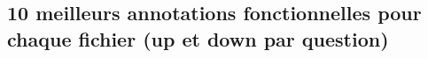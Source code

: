 \documentclass[a4paper]{article}
\begin{document}
\par



%

\par
\subsection*{10 meilleurs annotations fonctionnelles pour chaque fichier (up et down par question)}

%
\end{document}
